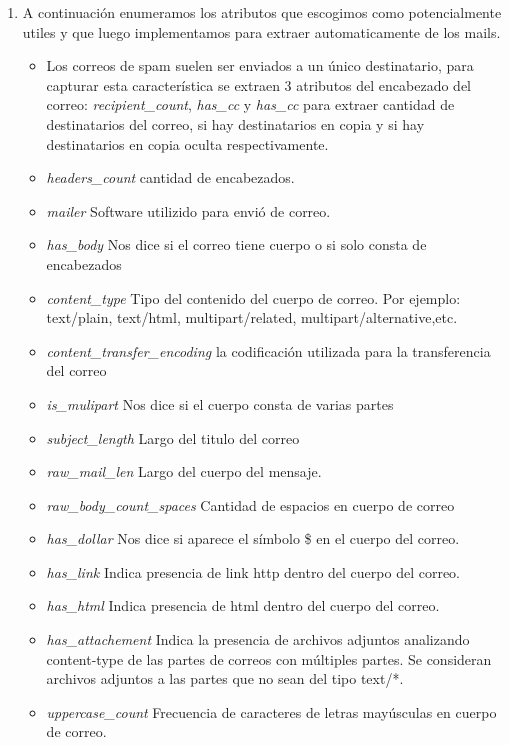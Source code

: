 
\begin{enumerate}

\item A continuación enumeramos los atributos que escogimos como potencialmente utiles y que luego implementamos para extraer automaticamente de los mails.

\begin{itemize}
\item Los correos de spam suelen ser enviados a un único destinatario, para capturar esta característica se extraen 3 atributos del encabezado del correo: \textit{recipient\_count}, \textit{has\_cc} y \textit{has\_cc} para extraer cantidad de destinatarios del correo, si hay destinatarios en copia y si hay destinatarios en copia oculta respectivamente.
\item \textit{headers\_count} cantidad de encabezados.
\item \textit{mailer} Software utilizido para envió de correo. 
\item \textit{has\_body} Nos dice si el correo tiene cuerpo o si solo consta de encabezados
\item \textit{content\_type} Tipo del contenido del cuerpo de correo. Por ejemplo: text/plain, text/html, multipart/related, multipart/alternative,etc. 
\item \textit{content\_transfer\_encoding} la codificación utilizada para la transferencia del correo
\item \textit{is\_mulipart} Nos dice si el cuerpo consta de varias partes
\item \textit{subject\_length} Largo del titulo  del correo
\item \textit{raw\_mail\_len} Largo del cuerpo del mensaje. 
\item \textit{raw\_body\_count\_spaces} Cantidad de espacios en cuerpo de correo
\item \textit{has\_dollar} Nos dice si aparece el símbolo \$ en el cuerpo del correo. 
\item \textit{has\_link} Indica presencia de link http dentro del cuerpo del correo. 
\item \textit{has\_html} Indica presencia de html dentro del cuerpo del correo. 
\item \textit{has\_attachement} Indica la presencia de archivos adjuntos analizando content-type de las partes de correos con múltiples partes. Se consideran archivos adjuntos  a las partes que no sean del tipo text/*. 
\item \textit{uppercase\_count} Frecuencia de caracteres de letras mayúsculas en cuerpo de correo.  

\end{itemize}
\end{enumerate}
